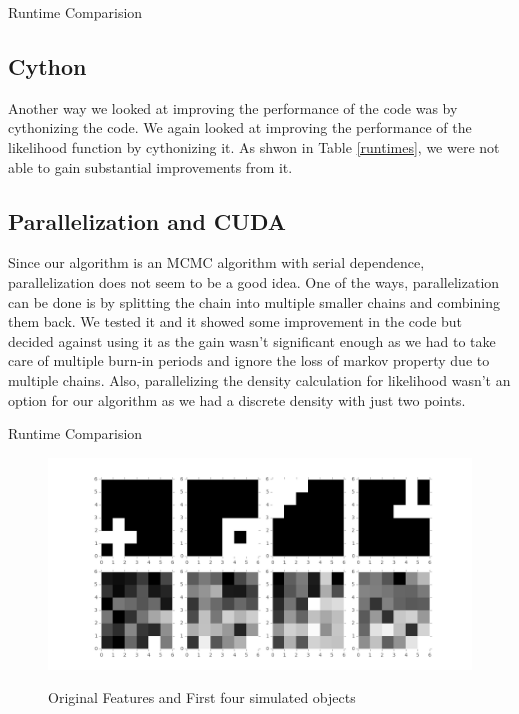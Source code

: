 \documentclass{article}
\begin{document}
\begin{table}[H]
\centering
\caption{Runtime Comparision \label{llcomp}}


\end{table}

\subsection{Cython}
Another way we looked at improving the performance of the code was by cythonizing the code. We again looked at improving the performance of the likelihood function by cythonizing it. As shwon in Table \ref{runtimes}, we were not able to gain substantial improvements from it.\\


\subsection{Parallelization and CUDA}
Since our algorithm is an MCMC algorithm with serial dependence, parallelization does not seem to be a good idea. One of the ways, parallelization can be done is by splitting the chain into multiple smaller chains and combining them back. We tested it and it showed some improvement in the code but decided against using it as the gain wasn't significant enough as we had to take care of multiple burn-in periods and ignore the loss of markov property due to multiple chains. Also, parallelizing the density calculation for likelihood wasn't an option for our algorithm as we had a discrete density with just two points.


\begin{table}[ht]
\centering
\caption{Runtime Comparision \label{runtimes}}

\end{table}



\begin{figure}
\caption {Original Features and First four simulated objects}
\includegraphics[width=\linewidth]{figures/Original.png}
\label{fig:original}
\end{figure}
\end{document}
